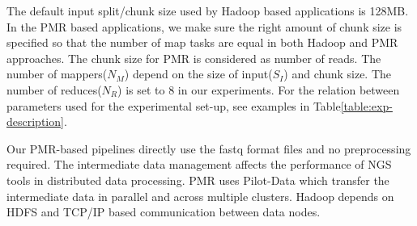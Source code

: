 \documentclass{acm_proc_article-sp}
\begin{document}
The default input split/chunk size used by Hadoop based applications
is 128MB. In the PMR based applications, we make sure the right amount
of chunk size is specified so that the number of map tasks are equal
in both Hadoop and PMR approaches. The chunk size for PMR is
considered as number of reads. The number of mappers($N_M$) depend on
the size of input($S_I$) and chunk size. The number of reduces($N_R$)
is set to 8 in our experiments. For the relation between parameters
used for the experimental set-up, see examples in
Table\ref{table:exp-description}.

Our PMR-based pipelines directly use the fastq format files and no
preprocessing required.  The intermediate data management affects the
performance of NGS tools in distributed data processing. PMR uses
Pilot-Data which transfer the intermediate data in parallel and across
multiple clusters. Hadoop depends on HDFS and TCP/IP based
communication between data nodes.


\end{document}
